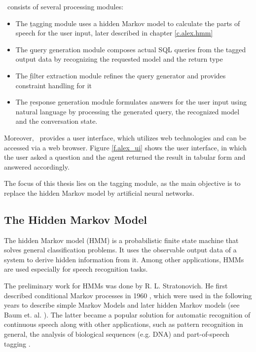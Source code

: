 \Alex\ consists of several processing modules:

\begin{itemize}
	\item The \b{tagging module} uses a hidden Markov model to calculate the parts of speech for the user input, later described in chapter \ref{c.alex.hmm}
	\item The \b{query generation module} composes actual SQL queries from the tagged output data by recognizing the requested model and the return type
	\item The \b{filter extraction module} refines the query generator and provides constraint handling for it
	\item The \b{response generation module} formulates answers for the user input using natural language by processing the generated query, the recognized model and the conversation state.
\end{itemize}

Moreover, \Alex\ provides a user interface, which utilizes web technologies and can be accessed via a web browser. Figure \ref{f.alex_ui} shows the user interface, in which the user asked a question and the agent returned the result in tabular form and answered accordingly.

The focus of this thesis lies on the tagging module, as the main objective is to replace the hidden Markov model by artificial neural networks.

\subsection{The Hidden Markov Model}\label{c.introduction.related.hmm}
The hidden Markov model (HMM) is a probabilistic finite state machine that solves general classification problems. It uses the observable output data of a system to derive hidden information from it. Among other applications, HMMs are used especially for speech recognition tasks.

The preliminary work for HMMs was done by R. L. Stratonovich. He first described conditional Markov processes in 1960 \cite{stratonovich1960}, which were used in the following years to describe simple Markov Models and later hidden Markov models (see Baum et. al. \cite{baum1966}\cite{baum1967}). The latter became a popular solution for automatic recognition of continuous speech \cite{baker1975} along with other applications, such as pattern recognition in general, the analysis of biological sequences (e.g. DNA) \cite{bishop1986} and part-of-speech tagging \cite{kupiec1992}.

